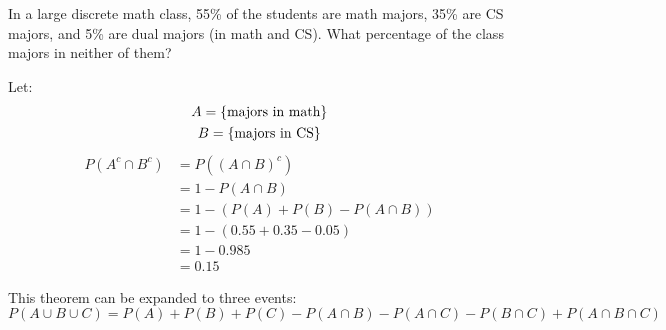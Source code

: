 \documentclass[letterpaper,12pt,fleqn]{article}
\begin{document}
\begin{example}
  In a large discrete math class, 55\% of the students are math majors, 35\% are CS majors, and 5\% are dual majors (in
  math and CS).  What percentage of the class majors in neither of them?

  Let:
  \begin{gather*}
    A=\{\text{majors in math}\} \\
    B=\{\text{majors in CS}\}
  \end{gather*}
  \begin{align*}
    P(A^c\cap B^c) &= P\left((A\cap B)^c\right) \\
    &= 1-P(A\cap B) \\
    &= 1-\left(P(A)+P(B)-P(A\cap B)\right) \\
    &= 1-(0.55+0.35-0.05) \\
    &= 1-0.985 \\
    &= 0.15
  \end{align*}
\end{example}

This theorem can be expanded to three events:
\[P(A\cup B\cup C)=P(A)+P(B)+P(C)-P(A\cap B)-P(A\cap C)-P(B\cap C)+P(A\cap B\cap C)\]
\end{document}

